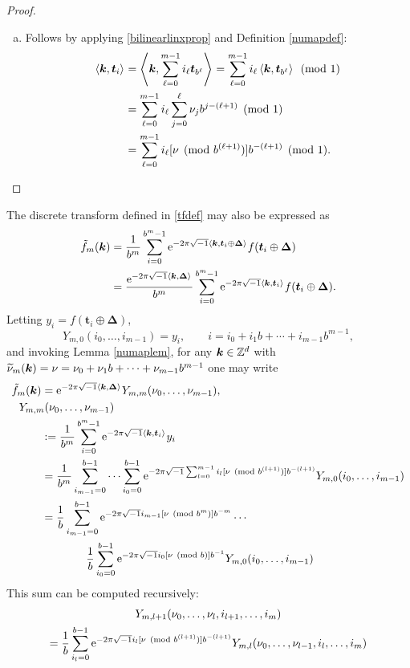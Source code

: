 \documentclass[graybox,footinfo]{svmult}
\newcommand{\Z}{\mathbb{Z}} %
\newcommand{\bst}{\boldsymbol{t}}    %
\newcommand{\bsDelta}{\boldsymbol{\Delta}}    %
\begin{document}
\begin{proof}
\begin{enumerate}[a)]
\item Follows by applying  \eqref{bilinearlinxprop} and Definition \ref{numapdef}:
\begin{align*}
\ip{\bsk}{\bst_i} &= \ip{\bsk}{\sum_{\ell=0}^{m-1} i_\ell \bst_{b^{\ell}}} = \sum_{\ell=0}^{m-1} i_\ell \ip{\bsk}{\bst_{b^{\ell}}} \pmod 1 \\
& = \sum_{\ell=0}^{m-1} i_\ell \sum_{j=0}^{\ell} \nu_jb^{j-(\ell+1)} \pmod 1\\
&=\sum_{\ell=0}^{m-1} i_\ell [\nu \pmod  {b^{(\ell+1)}}]  b^{-(\ell+1)} \pmod 1.
\end{align*}

\end{enumerate}
\end{proof}

The discrete transform defined in \eqref{tfdef} may also be expressed as
\begin{align}
\nonumber
\tf_m(\bsk)
&= \frac{1}{b^m} \sum_{i=0}^{b^m-1} \me^{-2 \pi \sqrt{-1} \ip{\bsk}{\bst_i\oplus \bsDelta}} f(\bst_i\oplus \bsDelta) \\
\nonumber
&= \frac{\me^{-2 \pi \sqrt{-1} \ip{\bsk}{\bsDelta}}}{b^m} \sum_{i=0}^{b^m-1} \me^{-2 \pi \sqrt{-1} \ip{\bsk}{\bst_i}} f(\bst_i\oplus \bsDelta).
\end{align}
Letting $y_i=f(\bst_i\oplus \bsDelta)$,
\[
Y_{m,0}(i_0,\ldots, i_{m-1}) = y_i, \qquad i=i_0 + i_1 b + \cdots + i_{m-1} b^{m-1},
\]
and invoking Lemma \ref{numaplem}, for any $\bsk \in \Z^d$ with $\widetilde{\nu}_m(\boldsymbol{k})=\nu = \nu_0 + \nu_1 b  + \cdots + \nu_{m-1} b^{m-1}$ one may write
\begin{align}
\nonumber
\tf_m(\bsk) &= \me^{-2 \pi \sqrt{-1} \ip{\bsk}{\bsDelta}}  Y_{m,m}(\nu_0, \ldots, \nu_{m-1}) , \\
\nonumber
\MoveEqLeft{Y_{m,m}(\nu_0, \ldots, \nu_{m-1})}\\
\nonumber
& : = \frac{1}{b^m} \sum_{i=0}^{b^m-1} \me^{-2 \pi \sqrt{-1} \ip{\bsk}{\bst_i}} y_i \\
\nonumber
& = \frac{1}{b^m} \sum_{i_{m-1}=0}^{b-1} \cdots \sum_{i_0=0}^{b-1} \me^{-2 \pi \sqrt{-1}\sum_{l=0}^{m-1} i_l [\nu \pmod  {b^{(l+1)}}]  b^{-(l+1)}} Y_{m,0}(i_0,\ldots, i_{m-1}) \\
\nonumber
& = \frac{1}{b} \sum_{i_{m-1}=0}^{b-1}\me^{-2 \pi \sqrt{-1}  i_{m-1}[\nu \pmod  {b^{m}}]  b^{-m}}  \cdots \\
&\qquad \qquad \frac{1}{b} \sum_{i_0=0}^{b-1} \me^{-2 \pi \sqrt{-1} i_0 [\nu \pmod  {b}]  b^{-1}} Y_{m,0}(i_0,\ldots, i_{m-1})
\nonumber
\end{align}
This sum can be computed recursively:
\begin{multline*}
Y_{m,l+1}(\nu_0, \ldots, \nu_{l},i_{l+1}, \ldots, i_m) \\
= \frac{1}{b} \sum_{i_l=0}^{b-1} \text{e}^{-2 \pi \sqrt{-1}  i_{l}[\nu \pmod  {b^{(l+1)}}]  b^{-(l+1)}} Y_{m,l}(\nu_0, \ldots, \nu_{l-1},i_{l}, \ldots, i_m)
\end{multline*}
\end{document}
